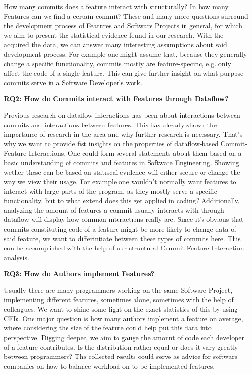 How many commits does a feature interact with structurally? In how many Features can we find a certain commit?
These and many more questions surround the development process of Features and Software Projects in general, for which we aim to present the statistical evidence found in our research.
With the acquired the data, we can answer many interesting assumptions about said development process.
For example one might assume that, because they generally change a specific functionality, commits mostly are feature-specific, e.g. only affect the code of a single feature.
This can give further insight on what purpose commits serve in a Software Developer's work.

\textbf{RQ2: How do Commits interact with Features through Dataflow?}

Previous research on dataflow interactions has been about interactions between commits and interactions between features.
This has already shown the importance of research in the area and why further research is necessary.
That's why we want to provide fist insights on the properties of dataflow-based Commit-Feature Interactions.
One could form several statements about them based on a basic understanding of commits and features in Software Engineering.
Showing wether these can be based on statiscal evidence will either secure or change the way we view their usage.
For example one wouldn't normally want features to interact with large parts of the program, as they mostly serve a specific functionality, but to what extend does this get applied in coding?
Additionally, analyzing the amount of features a commit usually interacts with through dataflow will display how common interactions really are.
Since it's obvious that commits constituting code of a feature might be more likely to change data of said feature, we want to differintiate between these types of commits here.
This can be accomplished with the help of our structural Commit-Feature Interaction analysis. 

\textbf{RQ3: How do Authors implement Features?}

Usually there are many programmers working on the same Software Project, implementing different features, sometimes alone, sometimes with the help of colleagues.
We want to shine some light on the exact statistics of this by using CFIs.
One major question is how many authors implement a feature on average, where considering the size of the feature could help put this data into perspective.
Digging deeper, we aim to gauge the amount of code each developer of a feature contributes. Is the distribution rather equal or does it vary greatly between programmers?
The collected results could serve as advice for software companies on how to balance workload on to-be implemented features. 

